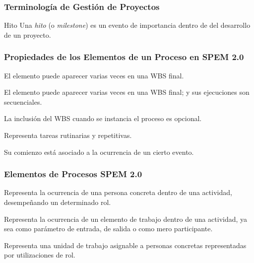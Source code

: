 \documentclass[a4paper,t]{beamer}
\begin{document}
\begin{frame}[c]
    \frametitle{Terminología de Gestión de Proyectos}
    \begin{block}{Hito}
        Una \emph{hito} (o \emph{milestone}) es un evento de importancia dentro de del desarrollo de un proyecto.
    \end{block}
\end{frame}

\begin{frame}[c]
    \frametitle{Propiedades de los Elementos de un Proceso en SPEM 2.0}
    \begin{description}[<+->]
        \item[hasMultipleOcurrences] El elemento puede aparecer varias veces en una WBS final.
        \item[isRepeteable] El elemento puede aparecer varias veces en una WBS final; y sus ejecuciones son secuenciales.
        \item[isOptional] La inclusión del WBS cuando se instancia el proceso es opcional.
        \item[isOngoing] Representa tareas rutinarias y repetitivas.
        \item[isEventDriven] Su comienzo está asociado a la ocurrencia de un cierto evento.
    \end{description}
\end{frame}

\begin{frame}[c]
    \frametitle{Elementos de Procesos SPEM 2.0}
    \begin{description}[<+->]
        \item[Role Use] Representa la ocurrencia de una persona concreta dentro de una actividad, desempeñando un determinado rol.
        \item[Work Use] Representa la ocurrencia de un elemento de trabajo dentro de una actividad, ya sea como parámetro de entrada, de salida o como mero participante.
        \item[Activity] Representa una unidad de trabajo asignable a personas concretas representadas por utilizaciones de rol.
    \end{description}
\end{frame}
\end{document}
